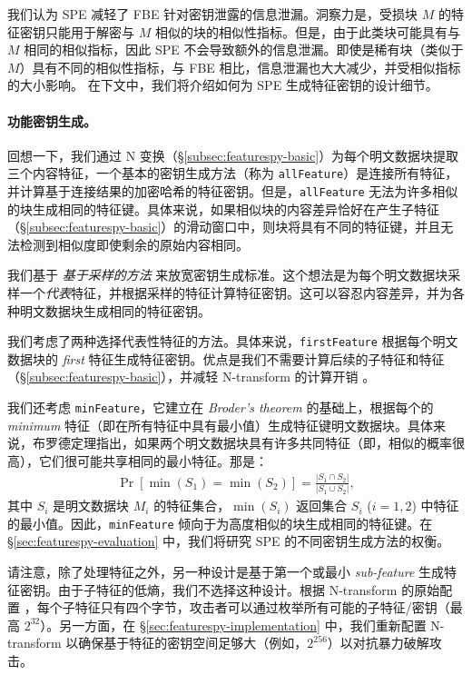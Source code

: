 我们认为 SPE 减轻了 FBE 针对密钥泄露的信息泄漏。洞察力是，受损块 $M$ 的特征密钥只能用于解密与 $M$ 相似的块的相似性指标。但是，由于此类块可能具有与 $M$ 相同的相似指标，因此 SPE 不会导致额外的信息泄漏。即使是稀有块（类似于 $M$）具有不同的相似性指标，与 FBE 相比，信息泄漏也大大减少，并受相似指标的大小影响。
在下文中，我们将介绍如何为 SPE 生成特征密钥的设计细节。


\paragraph*{功能密钥生成。}
回想一下，我们通过 N 变换（\S\ref{subsec:featurespy-basic}）为每个明文数据块提取三个内容特征，一个基本的密钥生成方法（称为 {\tt allFeature}）是连接所有特征，并计算基于连接结果的加密哈希的特征密钥。但是，{\tt allFeature} 无法为许多相似的块生成相同的特征键。具体来说，如果相似块的内容差异恰好在产生子特征（\S\ref{subsec:featurespy-basic}）的滑动窗口中，则块将具有不同的特征键，并且无法检测到相似度即使剩余的原始内容相同。

我们基于 {\em 基于采样的方法} \cite{bhagwat2009extreme, dong11, qin17} 来放宽密钥生成标准。这个想法是为每个明文数据块采样一个{\em 代表}特征，并根据采样的特征计算特征密钥。这可以容忍内容差异，并为各种明文数据块生成相同的特征密钥。

我们考虑了两种选择代表性特征的方法。具体来说，{\tt firstFeature} 根据每个明文数据块的 {\em first} 特征生成特征密钥。优点是我们不需要计算后续的子特征和特征（\S\ref{subsec:featurespy-basic}），并减轻 N-transform 的计算开销 \cite{zhang2019Finesse}。

我们还考虑 {\tt minFeature}，它建立在 {\em Broder's theorem} \cite{broder1997resemblance} 的基础上，根据每个的 {\em minimum} 特征（即在所有特征中具有最小值）生成特征键明文数据块。具体来说，布罗德定理指出，如果两个明文数据块具有许多共同特征（即，相似的概率很高），它们很可能共享相同的最小特征。那是：
\begin{eqnarray}
  \label{eq:featurespy-broder}
 \Pr[\min(S_1) = \min(S_2)] = \frac{|S_1 \cap S_2|}{|S_1 \cup S_2|},
\end{eqnarray}
其中 $S_i$ 是明文数据块 $M_i$ 的特征集合，$\min(S_i)$ 返回集合 $S_i$ ($i = 1, 2$) 中特征的最小值。因此，{\tt minFeature} 倾向于为高度相似的块生成相同的特征键。在 \S\ref{sec:featurespy-evaluation} 中，我们将研究 SPE 的不同密钥生成方法的权衡。

请注意，除了处理特征之外，另一种设计是基于第一个或最小 {\em sub-feature} 生成特征密钥。由于子特征的低熵，我们不选择这种设计。根据 N-transform 的原始配置 \cite{shilane12}，每个子特征只有四个字节，攻击者可以通过枚举所有可能的子特征/密钥（最高 $2^{ 32}$）。另一方面，在 \S\ref{sec:featurespy-implementation} 中，我们重新配置 N-transform 以确保基于特征的密钥空间足够大（例如，$2^{256}$）以对抗暴力破解攻击。


